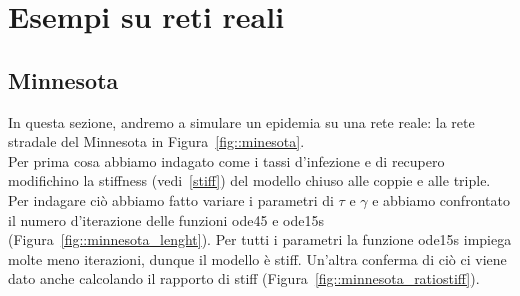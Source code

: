 \chapter{Esempi su reti reali}
\section{Minnesota}
In questa sezione, andremo a simulare un epidemia su una rete reale: la rete stradale del Minnesota in Figura~\ref{fig::minesota}.\\
Per prima cosa abbiamo indagato come  i tassi d'infezione e di recupero modifichino la stiffness (vedi~\ref{stiff}) del modello chiuso alle coppie e alle triple.\\
Per indagare ci\`o abbiamo fatto variare i parametri di $\tau$ e $\gamma$ e abbiamo confrontato il numero d'iterazione delle funzioni ode45 e ode15s (Figura~\ref{fig::minnesota_lenght}). Per tutti i parametri la funzione ode15s impiega molte meno iterazioni, dunque il modello \`e stiff. Un'altra conferma di ci\`o ci viene dato anche calcolando il rapporto di stiff (Figura~\ref{fig::minnesota_ratiostiff}).\\ \\ 

